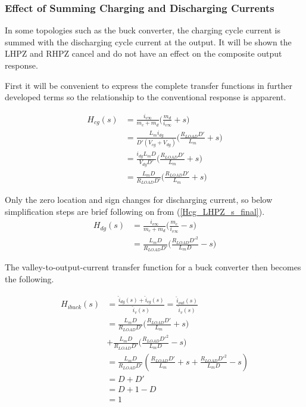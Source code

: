 \documentclass[conference]{IEEEtran}
\begin{document}
\subsubsection{Effect of Summing Charging and Discharging Currents}
In some topologies such as the buck converter, the charging cycle current is summed with the discharging cycle current at the output. It will be shown the LHPZ and RHPZ cancel and do not have an effect on the composite output response.

First it will be convenient to express the complete transfer functions in further developed terms so the relationship to the conventional response is apparent. 

\begin{align}
H_{cg} (s) &= \frac{i_{v\infty}}{m_c + m_d}
\big (\frac{m_d}{i_{v\infty}} + s \big ) \nonumber \\
&= \frac{L_m i_{dg}}{D' (V_{cg} + V_{dg})}
\big (\frac{R_{LOAD} D'}{L_m} + s \big ) \nonumber \\
&= \frac{i_{dg} L_m D}{V_{dg}D'}
\big (\frac{R_{LOAD} D'}{L_m} + s \big ) \nonumber \\
&= \frac{L_m D}{R_{LOAD}D'}
\big (\frac{R_{LOAD} D'}{L_m} + s \big ) 
\label{Hcg_LHPZ_s_final}
\end{align}

Only the zero location and sign changes for discharging current, so below simplification steps are brief following on from (\ref{Hcg_LHPZ_s_final}).
\begin{align}
H_{dg} (s) &= \frac{i_{v\infty}}{m_c + m_d}
\big (\frac{m_c}{i_{v\infty}} - s \big ) \nonumber \\
&= \frac{L_m D}{R_{LOAD}D'}
\big (\frac{R_{LOAD} D'^2}{L_m D} - s \big ) 
\label{Hdg_RHPZ_s_final}
\end{align}

The valley-to-output-current transfer function for a buck converter then becomes the following.

\begin{align}
	H_{ibuck}(s) &= \frac{\hat{i}_{dg}(s) + \hat{i}_{cg}(s)}{\hat{i}_v(s)} =
	\frac{\hat{i}_{out}(s)}{\hat{i}_v(s)} \nonumber \\
	&= \frac{L_m D}{R_{LOAD}D'}
	\big (\frac{R_{LOAD} D'}{L_m} + s \big ) \nonumber \\
	&+  \frac{L_m D}{R_{LOAD}D'}
	\big (\frac{R_{LOAD} D'^2}{L_m D} - s \big ) \nonumber \\
	&= \frac{L_m D}{R_{LOAD}D'} ( \frac{R_{LOAD} D'}{L_m} + s 
	+ \frac{R_{LOAD} D'^2}{L_m D} - s ) \nonumber \\
	&= D + D' \nonumber \\
	&= D + 1 - D \nonumber \\
	&= 1
	\label{H_valley_buck}
\end{align}
\end{document}
